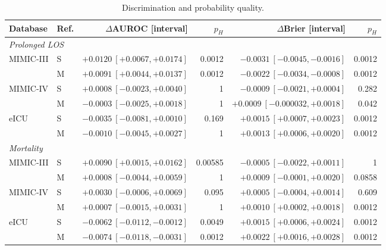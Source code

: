 \begin{table}[tp]
\centering\small
\setlength{\tabcolsep}{5pt}
\caption{Discrimination and probability quality.}
\label{tab:secondary-metrics}
\begin{tabular}{llrrrr}
\toprule
Database & Ref. & $\Delta$AUROC [interval] & $p_H$ & $\Delta$Brier [interval] & $p_H$ \\
\midrule
\multicolumn{6}{l}{\textit{Prolonged LOS}} \\
MIMIC-III & S & $+0.0120\ [+0.0067,+0.0174]$ & 0.0012 & $-0.0031\ [-0.0045,-0.0016]$ & 0.0012 \\
 & M & $+0.0091\ [+0.0044,+0.0137]$ & 0.0012 & $-0.0022\ [-0.0034,-0.0008]$ & 0.0012 \\
MIMIC-IV & S & $+0.0008\ [-0.0023,+0.0040]$ & 1 & $-0.0009\ [-0.0021,+0.0004]$ & 0.282 \\
 & M & $-0.0003\ [-0.0025,+0.0018]$ & 1 & $+0.0009\ [-0.000032,+0.0018]$ & 0.042 \\
eICU & S & $-0.0035\ [-0.0081,+0.0010]$ & 0.169 & $+0.0015\ [+0.0007,+0.0023]$ & 0.0012 \\
 & M & $-0.0010\ [-0.0045,+0.0027]$ & 1 & $+0.0013\ [+0.0006,+0.0020]$ & 0.0012 \\
\midrule
\multicolumn{6}{l}{\textit{Mortality}} \\
MIMIC-III & S & $+0.0090\ [+0.0015,+0.0162]$ & 0.00585 & $-0.0005\ [-0.0022,+0.0011]$ & 1 \\
 & M & $+0.0008\ [-0.0044,+0.0059]$ & 1 & $+0.0009\ [-0.0001,+0.0020]$ & 0.0858 \\
MIMIC-IV & S & $+0.0030\ [-0.0006,+0.0069]$ & 0.095 & $+0.0005\ [-0.0004,+0.0014]$ & 0.609 \\
 & M & $+0.0007\ [-0.0015,+0.0031]$ & 1 & $+0.0010\ [+0.0002,+0.0018]$ & 0.0012 \\
eICU & S & $-0.0062\ [-0.0112,-0.0012]$ & 0.0049 & $+0.0015\ [+0.0006,+0.0024]$ & 0.0012 \\
 & M & $-0.0074\ [-0.0118,-0.0031]$ & 0.0012 & $+0.0022\ [+0.0016,+0.0028]$ & 0.0012 \\
\bottomrule
\end{tabular}
\par{}
\end{table}
